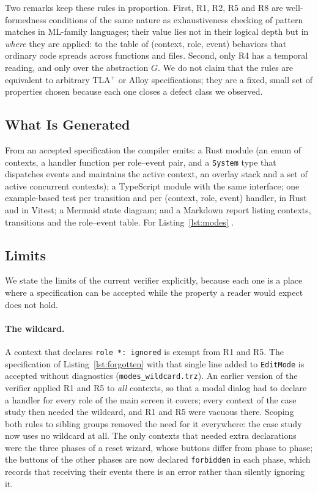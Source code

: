 Two remarks keep these rules in proportion. First, R1, R2, R5 and R8 are
well-formedness conditions of the same nature as exhaustiveness checking of
pattern matches in ML-family languages; their value lies not in their
logical depth but in \emph{where} they are applied: to the table of
(context, role, event) behaviors that ordinary code spreads across
functions and files. Second, only R4 has a temporal reading, and only over
the abstraction $G$. We do not claim that the rules are equivalent to
arbitrary TLA$^{+}$ or Alloy specifications; they are a fixed, small set of
properties chosen because each one closes a defect class we observed.

\subsection{What Is Generated}
\label{sec:generated}

From an accepted specification the compiler emits: a Rust module (an enum
of contexts, a handler function per role--event pair, and a
\texttt{System} type that dispatches events and maintains the active
context, an overlay stack and a set of active concurrent contexts); a
TypeScript module with the same interface; one example-based test per
transition and per (context, role, event) handler, in Rust and in Vitest;
a Mermaid state diagram; and a Markdown report listing contexts,
transitions and the role--event table. For Listing~\ref{lst:modes}
.

\subsection{Limits}
\label{sec:limits}

We state the limits of the current verifier explicitly, because each one
is a place where a specification can be accepted while the property a
reader would expect does not hold.

\paragraph{The wildcard.} A context that declares \texttt{role *: ignored}
is exempt from R1 and R5. The specification of Listing~\ref{lst:forgotten}
with that single line added to \texttt{EditMode} is accepted without
diagnostics (\texttt{modes\_wildcard.trz}). An earlier version of the
verifier applied R1 and R5 to \emph{all} contexts, so that a modal dialog
had to declare a handler for every role of the main screen it covers; every
context of the case study then needed the wildcard, and R1 and R5 were
vacuous there. Scoping both rules to sibling groups removed the need for
it everywhere: the case study now uses no wildcard at all. The only
contexts that needed extra declarations were the three phases of a reset
wizard, whose buttons differ from phase to phase; the buttons of the other
phases are now declared \texttt{forbidden} in each phase, which records
that receiving their events there is an error rather than silently
ignoring it.

